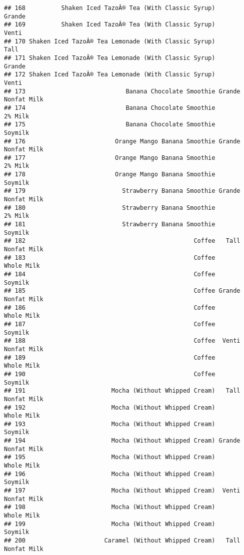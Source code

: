 \documentclass[
]{article}
\begin{document}
\begin{verbatim}
## 168          Shaken Iced TazoÂ® Tea (With Classic Syrup)             Grande
## 169          Shaken Iced TazoÂ® Tea (With Classic Syrup)              Venti
## 170 Shaken Iced TazoÂ® Tea Lemonade (With Classic Syrup)               Tall
## 171 Shaken Iced TazoÂ® Tea Lemonade (With Classic Syrup)             Grande
## 172 Shaken Iced TazoÂ® Tea Lemonade (With Classic Syrup)              Venti
## 173                            Banana Chocolate Smoothie Grande Nonfat Milk
## 174                            Banana Chocolate Smoothie            2% Milk
## 175                            Banana Chocolate Smoothie            Soymilk
## 176                         Orange Mango Banana Smoothie Grande Nonfat Milk
## 177                         Orange Mango Banana Smoothie            2% Milk
## 178                         Orange Mango Banana Smoothie            Soymilk
## 179                           Strawberry Banana Smoothie Grande Nonfat Milk
## 180                           Strawberry Banana Smoothie            2% Milk
## 181                           Strawberry Banana Smoothie            Soymilk
## 182                                               Coffee   Tall Nonfat Milk
## 183                                               Coffee         Whole Milk
## 184                                               Coffee            Soymilk
## 185                                               Coffee Grande Nonfat Milk
## 186                                               Coffee         Whole Milk
## 187                                               Coffee            Soymilk
## 188                                               Coffee  Venti Nonfat Milk
## 189                                               Coffee         Whole Milk
## 190                                               Coffee            Soymilk
## 191                        Mocha (Without Whipped Cream)   Tall Nonfat Milk
## 192                        Mocha (Without Whipped Cream)         Whole Milk
## 193                        Mocha (Without Whipped Cream)            Soymilk
## 194                        Mocha (Without Whipped Cream) Grande Nonfat Milk
## 195                        Mocha (Without Whipped Cream)         Whole Milk
## 196                        Mocha (Without Whipped Cream)            Soymilk
## 197                        Mocha (Without Whipped Cream)  Venti Nonfat Milk
## 198                        Mocha (Without Whipped Cream)         Whole Milk
## 199                        Mocha (Without Whipped Cream)            Soymilk
## 200                      Caramel (Without Whipped Cream)   Tall Nonfat Milk

\end{verbatim}
\end{document}

